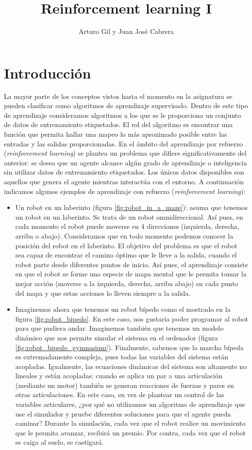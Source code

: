 \documentclass{article}
\title{Reinforcement learning I}
\author{Arturo Gil y Juan José Cabrera}
\begin{document}
\maketitle

\section{Introducción}
La mayor parte de los conceptos vistos hasta el momento en la asignatura se pueden clasificar como algoritmos de aprendizaje supervisado. Dentro de este tipo de aprendizaje consideramos algoritmos a los que se le proporciona un conjunto de datos de entrenamiento etiquetados. El rol del algoritmo es encontrar una función que permita hallar una mapeo lo más aproximado posible entre las entradas y las salidas proporcionadas. En el ámbito del aprendizaje por refuerzo (\emph{reinforcement learning}) se plantea un problema que difiere significativamente del anterior: se desea que un agente alcance algún grado de aprendizaje o inteligencia sin utilizar datos de entrenamiento etiquetados. Los únicos datos disponibles son aquellos que genera el agente mientras interactúa con el entorno. A continuación indicamos algunos ejemplos de aprendizaje con refuerzo (\textit{reinforcement learning}):
\begin{itemize}
    \item Un robot en un laberinto (figura \ref{fig:robot_in_a_maze}): asuma que tenemos un robot en un laberinto. Se trata de un robot omnidireccional. Así pues, en cada momento el robot puede moverse en 4 direcciones (izquierda, derecha, arriba o abajo). Consideramos que en todo momento podemos conocer la posición del robot en el laberinto. El objetivo del problema es que el robot sea capaz de encontrar el camino óptimo que le lleve a la salida, cuando el robot parte desde diferentes puntos de inicio. Así pues, el aprendizaje consiste en que el robot se forme una especie de mapa mental que le permita tomar la mejor acción (moverse a la izquierda, derecha, arriba abajo) en cada punto del mapa y que estas acciones lo lleven siempre a la salida.
    \item Imaginemos ahora que tenemos un robot bípedo como el mostrado en la figura \ref{fig:robot_bipedo}. En este caso, nos gustaría poder programar al robot para que pudiera andar. Imaginemos también que tenemos un modelo dinámico que nos permite simular el sistema en el ordenador (figura \ref{fig:robot_bipedo_gymnasium}). Finalmente, sabemos que la marcha bípeda es extremadamente compleja, pues todas las variables del sistema están acopladas. Igualmente, las ecuaciones dinámicas del sistema son altamente no lineales y están acopladas: cuando se aplica un par a una articulación (mediante un motor) también se generan reacciones de fuerzas y pares en otras articulaciones. En este caso, en vez de plantear un control de las variables articulares, ¿por qué no utilizamos un algoritmo de aprendizaje que use el simulador y pruebe diferentes soluciones para que el agente pueda caminar? Durante la simulación, cada vez que el robot realice un movimiento que le permita avanzar, recibirá un premio. Por contra, cada vez que el robot se caiga al suelo, se castigará.
\end{itemize}
\end{document}
